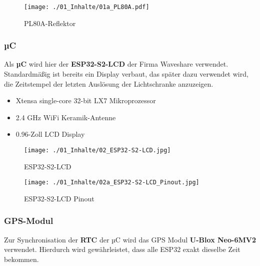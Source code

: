 \begin{figure}[H]
	\texttt{[image: ./01\_Inhalte/01a\_PL80A.pdf]}	
	\centering
	\caption{PL80A-Reflektor}
	\label{fig:PL80A}
\end{figure}


\subsubsection{\ac{µC}}
Als \textbf{\ac{µC}} wird hier der \textbf{ESP32-S2-LCD} der Firma Waveshare verwendet. Standardmäßig ist bereits ein Display verbaut, das später dazu verwendet wird, die Zeitstempel der letzten Auslösung der Lichtschranke anzuzeigen.

\begin{minipage}{0.6\textwidth}
	\begin{itemize}
		\item Xtensa single-core 32-bit LX7 Mikroprozessor
		\item 2.4 GHz WiFi Keramik-Antenne
		\item 0.96-Zoll LCD Display
	\end{itemize}
\end{minipage}%
\begin{minipage}{0.4\textwidth}		
	\begin{figure}[H]
		\texttt{[image: ./01\_Inhalte/02\_ESP32-S2-LCD.jpg]}	
		\centering
		\caption{ESP32-S2-LCD}
		\label{fig:ESP32-S2-LCD}
	\end{figure}
\end{minipage}	

\begin{figure}[H]
	\texttt{[image: ./01\_Inhalte/02a\_ESP32-S2-LCD\_Pinout.jpg]}	
	\centering
	\caption{ESP32-S2-LCD Pinout}
	\label{fig:ESP32-S2-LCD_Pinout}
\end{figure}



\subsubsection{GPS-Modul}
Zur Synchronisation der \textbf{\ac{RTC}} der \acl{µC} wird das GPS Modul \textbf{U-Blox Neo-6MV2} verwendet. Hierdurch wird gewährleistet, dass alle ESP32 exakt dieselbe Zeit bekommen.

